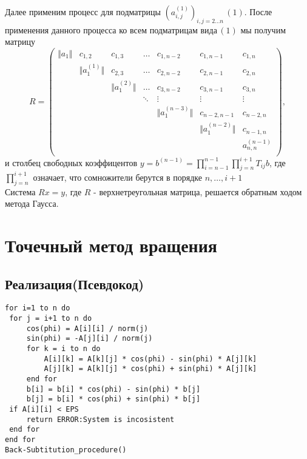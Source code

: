 \documentclass[a4paper, fontsize=14pt]{article}
\begin{document}
		Далее применим процесс для подматрицы $(a_{i,j}^{(1)})_{i,j = 2\dots n}\,(1)$. После применения данного процесса ко всем подматрицам вида$\,(1)$ мы получим матрицу 
		\begin{equation*}
			R =
			\left(
			\begin{array}{ccccccc}
				\Vert a_1\Vert & c_{1,2} & c_{1,3} & \ldots & c_{1,n-2} & c_{1,n-1} & c_{1,n}\\
				 					 & \Vert a_1^{(1)}\Vert & c_{2,3} & \ldots & c_{2,n-2} & c_{2,n-1} & c_{2,n}\\
									 		&  & \Vert a_1^{(2)}\Vert & \ldots & c_{3,n-2} & c_{3,n-1} & c_{3,n}\\
									 		&  &  &\ddots & \vdots & \vdots & \vdots\\
											&  &  & & \Vert a_1^{(n-3)}\Vert  & c_{n-2,n-1} & c_{n-2,n}\\
											&  &  & & & \Vert a_1^{(n-2)}\Vert   & c_{n-1,n}\\
											&  &  & & & & a_{n,n}^{(n-1)}\\
			\end{array}
			\right),
			\end{equation*}
		и столбец свободных коэффицентов 
		$y = b^{(n-1)} = \prod_{i = n-1}^{n-1}\prod_{j=n}^{i+1}T_{ij}b$, где $\prod_{j=n}^{i+1}$ означает, что сомножители берутся в порядке $n,\dots,i+1$
		\\Система $Rx=y$, где $R$ - верхнетреугольная матрица, решается обратным ходом метода Гаусса.

	
	 	
 	
	\newpage
 	\section{Точечный метод вращения}
	 	\subsection{Реализация(Псевдокод)}
	 	
	 	\lstinline$for i=1 to n do $
	 	\\
	 	\lstinline$	for j = i+1 to n do$
	 	\\
	 	\lstinline$		cos(phi) = A[i][i] / norm(j) $
	 	\\
	 	\lstinline$		sin(phi) = -A[j][i] / norm(j) $
	 	\\
		\lstinline$		for k = i to n do$
		\\
		\lstinline$			A[i][k] = A[k][j] * cos(phi) - sin(phi) * A[j][k]$
		\\
		\lstinline$			A[j][k] = A[k][j] * cos(phi) + sin(phi) * A[j][k]$
		\\
		\lstinline$		end for$
		\\
		\lstinline$		b[i] = b[i] * cos(phi) - sin(phi) * b[j]$
		\\
		\lstinline$		b[j] = b[i] * cos(phi) + sin(phi) * b[j]$
		\\	
		\lstinline$	if A[i][i] < EPS $
		\\	
		\lstinline$		return ERROR:System is incosistent$
		\\	
		\lstinline$	end for$
		\\
		\lstinline$end for$
		\\
		\lstinline$Back-Subtitution_procedure()$
\end{document}
